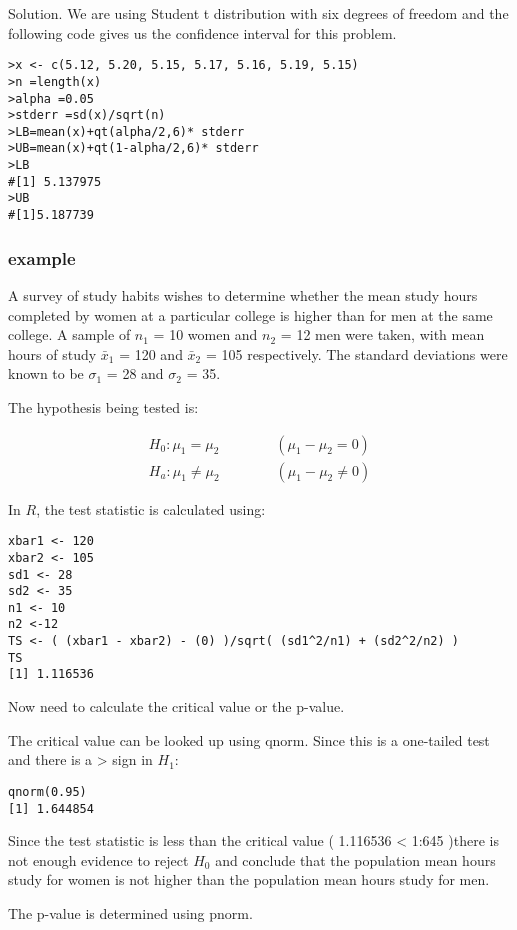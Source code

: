 Solution. We are using Student t distribution with six degrees of
freedom and the following code gives us the confidence interval
for this problem.
\begin{verbatim}
>x <- c(5.12, 5.20, 5.15, 5.17, 5.16, 5.19, 5.15)
>n =length(x)
>alpha =0.05
>stderr =sd(x)/sqrt(n)
>LB=mean(x)+qt(alpha/2,6)* stderr
>UB=mean(x)+qt(1-alpha/2,6)* stderr
>LB
#[1] 5.137975
>UB
#[1]5.187739
\end{verbatim}


\subsubsection{example}
A survey of study habits wishes to determine whether the mean
study hours completed by women at a particular college is higher
than for men at the same college. A sample of $n_1$ = 10 women and
$n_2$ = 12 men were taken, with mean hours of study $\bar{x}_1$ =
120 and $\bar{x}_2$ = 105 respectively. The standard deviations
were known to be $\sigma_1$ = 28 and $\sigma_2$ = 35.

The hypothesis being tested is:

\begin{eqnarray}
H_{0}: \mu_1 = \mu_2\qquad \qquad (\mu_1 - \mu_2= 0)\\
H_{a}: \mu_1 \neq \mu_2 \qquad \qquad (\mu_1 - \mu_2 \neq 0)
\end{eqnarray}

In $R$, the test statistic is calculated using:

\begin{verbatim}
xbar1 <- 120
xbar2 <- 105
sd1 <- 28
sd2 <- 35
n1 <- 10
n2 <-12
TS <- ( (xbar1 - xbar2) - (0) )/sqrt( (sd1^2/n1) + (sd2^2/n2) )
TS
[1] 1.116536
\end{verbatim}
Now need to calculate the critical value or the p-value.


The critical value can be looked up using qnorm. Since this is a
one-tailed test and there is a > sign in $H_1$:

\begin{verbatim}
qnorm(0.95)
[1] 1.644854
\end{verbatim}

Since the test statistic is less than the critical value ( 1.116536 < 1:645 )there is not enough evidence to reject $H_0$
and conclude that the population mean hours study for women is
not higher than the population mean hours study for men.


The p-value is determined using pnorm.


